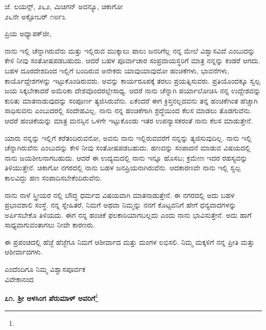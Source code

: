 \begin{flushright}
 ಜೆ. ಲಯನ್ಸ್, ೨೬೨, ಮಿಚಿಗನ್ ಅವನ್ಯೂ, ಚಿಕಾಗೋ\\೨೬ನೇ ಅಕ್ಟೋಬರ್ ೧೮೯೩
\end{flushright}

\noindent
ಪ್ರಿಯ ಅಧ್ಯಾಪಕ್‌ಜೀ,

ನಾನು ಇಲ್ಲಿ ಚೆನ್ನಾಗಿರುವೆನು ಮತ್ತು ಇಲ್ಲಿರುವ ಮುಕ್ಕಾಲು ಪಾಲು ಜನರಿಗೆಲ್ಲ ನನ್ನ ಮೇಲೆ ವಿಶ್ವಾಸವಿದೆ ಎಂಬುದನ್ನು ಕೇಳಿ ನೀವು ಸಂತೋಷಪಡಬಹುದು. ಆದರೆ ಬಹಳ ಪೂರ್ವಾಚಾರ ಸಂಪ್ರದಾಯಸ್ಥರಿಗೆ ಮಾತ್ರ ನನ್ನನ್ನು ಕಂಡರೆ ಆಗದು. ಬಹಳ ದೂರದೇಶದಿಂದ ಇಲ್ಲಿಗೆ ಬಂದಿರುವ ಅನೇಕರು ಯಾವುಯಾವುದೋ ಹಂಚಿಕೆಗಳು, ಭಾವನೆಗಳು, ಕಾರ್ಯೊದ್ದೇಶಗಳನ್ನು ಇಟ್ಟುಕೊಂಡಿರುವರು. ಅವನ್ನು ಕಾರ್ಯರೂಪಕ್ಕೆ ತರಲು ಪ್ರಯತ್ನಿಸುವರು. ಪ್ರತಿಯೊಂದಕ್ಕೂ ಸ್ವಲ್ಪ ಜಯ ಸಿಕ್ಕಬೇಕಾದರೆ ಅಮೆರಿಕಾ ದೇಶವೊಂದರಲ್ಲೇಸಾಧ್ಯ. ಆದರೆ ನಾನು ಚೆನ್ನಾಗಿ ಪರ್ಯಾಲೋಚಿಸಿ ನನ್ನ ಉದ್ದೇಶವನ್ನು ಕುರಿತು ಮಾತನಾಡುವುದನ್ನು ಸಂಪೂರ್ಣ ತ್ಯಜಿಸಿರುವೆನು. ಏಕೆಂದರೆ ಈಗ ಕ್ರಿಸ್ತನಲ್ಲದವನು ತನ್ನ ಹಂಚಿಕೆಗಿಂತ ಹೆಚ್ಚಾಗಿ ಸಾಧಿಸುವನು ಎಂಬುದರಲ್ಲಿ ಸಂದೇಹವಿಲ್ಲ. ನಾನು ನನ್ನ ಹಂಚಿಕೆಗಾಗಿ ಶ್ರದ್ಧೆಯಿಂದ ಕೆಲಸ ಮಾಡಲು ತೊಡಗುವೆನು. ಆದರೆ ಹಂಚಿಕೆಯನ್ನು ಮಾತ್ರ ಮನಸ್ಸಿನ ಒಳಗೇ ಇಟ್ಟುಕೊಂಡು ಇತರ ಉಪನ್ಯಾಸಕರಂತೆ ನಾನು ಕೆಲಸ ಮಾಡುತ್ತೇನೆ.

ಯಾರು ನನ್ನನ್ನು ಇಲ್ಲಿಗೆ ಕರೆತಂದಿರುವನೋ, ಅವನು ನಾನು ಇಲ್ಲಿರುವವರೆಗೆ ನನ್ನನ್ನು ತ್ಯಜಿಸುವುದಿಲ್ಲ. ನಾನು ಇಲ್ಲಿ ಚೆನ್ನಾಗಿರುವೆನು ಎಂಬುದನ್ನು ಕೇಳಿ ನೀವು ಸಂತೋಷಪಡಬಹುದು. ಹಣವನ್ನು ಸಂಪಾದನೆ ಮಾಡುವ ವಿಷಯದಲ್ಲಿ ನಾನು ಜಯಶೀಲನಾಗಬಹುದು. ಆದರೆ ಈ ಉದ್ಯಮದಲ್ಲಿ ನಾನು ಇನ್ನೂ ಹೊಸಬ; ಕ್ರಮೇಣ ಇದರ ರಹಸ್ಯವನ್ನು ತಿಳಿಯುತ್ತೇನೆ. ಚಿಕಾಗೋ ನಗರದಲ್ಲಿ ನಾನು ಬಹಳ ಜನಪ್ರಿಯನಾಗಿರುವೆನು. ಆದಕಾರಣವೇ ನಾನು ಇಲ್ಲಿ ಸ್ವಲ್ಪ ಕಾಲವಿದ್ದು ಹಣ ಸಂಪಾದಿಸಬೇಕೆಂದಿರುವೆನು.

ನಾನು ನಾಳೆ ಸ್ತ್ರೀಯರ ನಲ್ಲಿ ಬೌದ್ಧ ಧರ್ಮದ ವಿಷಯವಾಗಿ ಮಾತನಾಡುತ್ತೇನೆ. ಈ ನಗರದಲ್ಲಿ ಅದು ಬಹಳ ಪ್ರಭಾವಶಾಲಿ ಸಂಸ್ಥೆ. ನನ್ನ ಸ್ನೇಹಿತರೆ, ನಿಮಗೆ ಅಥವಾ ನಿಮ್ಮನ್ನು ನನಗೆ ಕೊಟ್ಟವನಿಗೆ ಹೇಗೆ ಧನ್ಯವಾದಗಳನ್ನು ಅರ್ಪಿಸಬೇಕೊ ತಿಳಿಯದು. ಈಗ ನನ್ನ ಹಂಚಿಕೆ ಫಲಕಾರಿಯಾಗಬಲ್ಲದು ಎಂದು ನಾನು ಭಾವಿಸುತ್ತೇನೆ. ಅದು ಹಾಗೆ ಸಾಧ್ಯವಾಗುವಂತಾಗಲು ನೀವೇ ಕಾರಣರು.

ಈ ಪ್ರಪಂಚದಲ್ಲಿ ಹೆಜ್ಜೆ ಹೆಜ್ಜೆಗೂ ನಿಮಗೆ ಆಶೀರ್ವಾದ ಮತ್ತು ಮಂಗಳ ಲಭಿಸಲಿ. ನಿಮ್ಮ ಮಕ್ಕಳಿಗೆ ನನ್ನ ಪ್ರೀತಿ ಮತ್ತು ಆಶೀರ್ವಾದಗಳು.

\vspace{-0.3cm}

{\flushright
ಎಂದೆಂದಿಗೂ ನಿಮ್ಮ ವಿಶ್ವಾಸಪೂರ್ವಕ\\ವಿವೇಕಾನಂದ\par}


\begin{center}
\textbf{೭೧. ಶ‍್ರೀ ಅಳಸಿಂಗ ಪೆರುಮಾಳ್ ಅವರಿಗೆ}\footnote{}
\end{center}

\vspace{-0.5cm}

